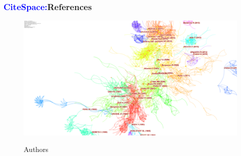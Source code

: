 ﻿\documentclass{beamer}
\begin{document}
\begin{frame}
\frametitle{\textcolor{blue}{CiteSpace:}References}
\begin{figure}
  \centering
  \includegraphics[scale=0.1]{./pic/reference.png}\\
  \caption{Authors}\label{fig_okada}
\end{figure}
\end{frame}
\end{document}
